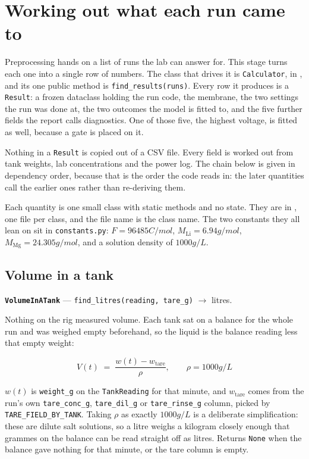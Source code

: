 \section{Working out what each run came to}

Preprocessing hands on a list of runs the lab can answer for. This stage turns each one into a
single row of numbers. The class that drives it is \texttt{Calculator}, in
, and its one public method is
\texttt{find\_results(runs)}. Every row it produces is a \texttt{Result}: a frozen dataclass
holding the run code, the membrane, the two settings the run was done at, the two outcomes the
model is fitted to, and the five further fields the report calls diagnostics. One of those five,
the highest voltage, is fitted as well, because a gate is placed on it.

Nothing in a \texttt{Result} is copied out of a CSV file. Every field is worked out from tank
weights, lab concentrations and the power log. The chain below is given in dependency order,
because that is the order the code reads in: the later quantities call the earlier ones rather
than re-deriving them.

Each quantity is one small class with static methods and no state. They are in
, one file per class, and the file name is the
class name. The two constants they all lean on sit in \texttt{constants.py}:
$F = 96485\unit{C/mol}$, $M_\mathrm{Li} = 6.94\unit{g/mol}$,
$M_\mathrm{Mg} = 24.305\unit{g/mol}$, and a solution density of $1000\unit{g/L}$.

\subsection{Volume in a tank}

\textbf{\texttt{VolumeInATank}} --- \texttt{find\_litres(reading, tare\_g)} $\rightarrow$
litres.

Nothing on the rig measured volume. Each tank sat on a balance for the whole run and was weighed
empty beforehand, so the liquid is the balance reading less that empty weight:

\begin{equation}
  V(t) \;=\; \frac{w(t) - w_\mathrm{tare}}{\rho},
  \qquad \rho = 1000\unit{g/L}
  \label{eq:volume}
\end{equation}

$w(t)$ is \texttt{weight\_g} on the \texttt{TankReading} for that minute, and $w_\mathrm{tare}$
comes from the run's own \texttt{tare\_conc\_g}, \texttt{tare\_dil\_g} or \texttt{tare\_rinse\_g}
column, picked by \texttt{TARE\_FIELD\_BY\_TANK}. Taking $\rho$ as exactly
$1000\unit{g/L}$ is a deliberate simplification: these are dilute salt solutions, so a litre
weighs a kilogram closely enough that grammes on the balance can be read straight off as litres.
Returns \texttt{None} when the balance gave nothing for that minute, or the tare column is empty.

